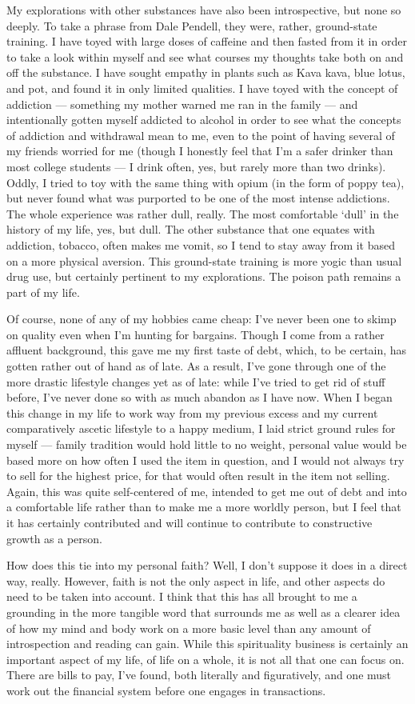 My explorations with other substances have also been introspective, but none so deeply. To take a phrase from Dale Pendell, they were, rather, ground-state training. I have toyed with large doses of caffeine and then fasted from it in order to take a look within myself and see what courses my thoughts take both on and off the substance. I have sought empathy in plants such as Kava kava, blue lotus, and pot, and found it in only limited qualities. I have toyed with the concept of addiction --- something my mother warned me ran in the family --- and intentionally gotten myself addicted to alcohol in order to see what the concepts of addiction and withdrawal mean to me, even to the point of having several of my friends worried for me (though I honestly feel that I'm a safer drinker than most college students --- I drink often, yes, but rarely more than two drinks). Oddly, I tried to toy with the same thing with opium (in the form of poppy tea), but never found what was purported to be one of the most intense addictions. The whole experience was rather dull, really. The most comfortable `dull' in the history of my life, yes, but dull. The other substance that one equates with addiction, tobacco, often makes me vomit, so I tend to stay away from it based on a more physical aversion. This ground-state training is more yogic than usual drug use, but certainly pertinent to my explorations. The poison path remains a part of my life.

Of course, none of any of my hobbies came cheap: I've never been one to skimp on quality even when I'm hunting for bargains. Though I come from a rather affluent background, this gave me my first taste of debt, which, to be certain, has gotten rather out of hand as of late. As a result, I've gone through one of the more drastic lifestyle changes yet as of late: while I've tried to get rid of stuff before, I've never done so with as much abandon as I have now. When I began this change in my life to work way from my previous excess and my current comparatively ascetic lifestyle to a happy medium, I laid strict ground rules for myself --- family tradition would hold little to no weight, personal value would be based more on how often I used the item in question, and I would not always try to sell for the highest price, for that would often result in the item not selling. Again, this was quite self-centered of me, intended to get me out of debt and into a comfortable life rather than to make me a more worldly person, but I feel that it has certainly contributed and will continue to contribute to constructive growth as a person.

How does this tie into my personal faith? Well, I don't suppose it does in a direct way, really. However, faith is not the only aspect in life, and other aspects do need to be taken into account. I think that this has all brought to me a grounding in the more tangible word that surrounds me as well as a clearer idea of how my mind and body work on a more basic level than any amount of introspection and reading can gain. While this spirituality business is certainly an important aspect of my life, of life on a whole, it is not all that one can focus on. There are bills to pay, I've found, both literally and figuratively, and one must work out the financial system before one engages in transactions.
